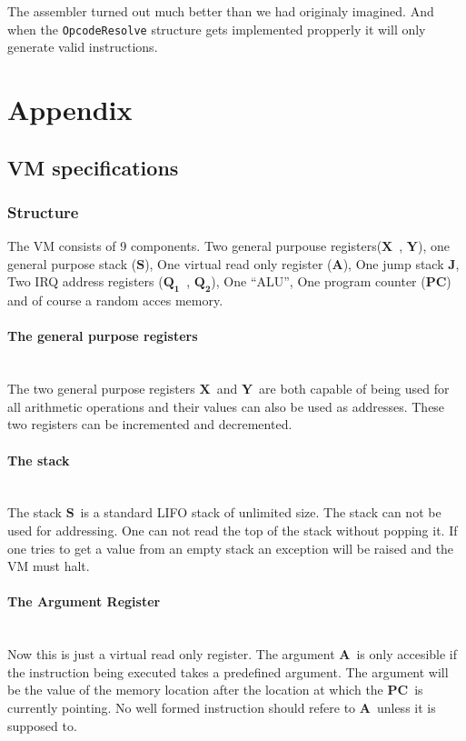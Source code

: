 \documentclass{article}
\newcommand{\V}{\verb}
\newcommand{\x}{$\textbf{X}$}
\newcommand{\y}{$\textbf{Y}$}
\newcommand{\s}{$\textbf{S}$}
\newcommand{\A}{$\textbf{A}$}
\newcommand{\q}{$\textbf{Q}_{\textbf{1}}$}
\newcommand{\qq}{$\textbf{Q}_{\textbf{2}}$}
\newcommand{\pc}{$\textbf{PC}$}
\newcommand{\J}{$\textbf{J}$}
\begin{document}
The assembler turned out much better than we had originaly imagined. And when
the \V+OpcodeResolve+ structure gets implemented propperly it will only generate
valid instructions.
\section{Appendix}
\subsection{VM specifications}
\subsubsection{Structure} 
The VM consists of 9 components. Two general purpouse registers(\x \ , \y ), one
general purpose stack (\s), One virtual read only register (\A), One jump stack
\J, Two IRQ address registers (\q \ , \qq), One ``ALU'', One program counter
(\pc) and of course a random acces memory.

\paragraph{The general purpose registers} \
\\
The two general purpose registers \x \ and \y \ are both capable of being used
for all arithmetic operations and their values can also be used as addresses.
These two registers can be incremented and decremented.

\paragraph{The stack} \
\\
The stack \s \ is a standard LIFO stack of unlimited size. The stack can not be
used for addressing. One can not read the top of the stack without popping it. If
one tries to get a value from an empty stack an exception will be raised and the
VM must halt.

\paragraph{The Argument Register} \
\\
Now this is just a virtual read only register. The argument \A \  is only
accesible if the instruction being executed takes a predefined argument. The
argument will be the value of the memory location after the location at which
the \pc \  is currently pointing. No well formed instruction should refere to
\A \ unless it is supposed to.
\end{document}
